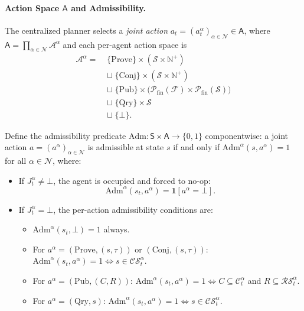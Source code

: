  
\paragraph{Action Space $\mathsf{A}$ and Admissibility.}
 
The centralized planner selects a \emph{joint action} $a_t = (a^\alpha_t)_{\alpha\in\mathcal{N}} \in \mathsf{A}$, where $\mathsf{A}= \prod_{\alpha\in\mathcal{N}}\mathcal{A}^\alpha$ and each per-agent action space is
\begin{align*}
\mathcal{A}^\alpha
=\;&
\{\mathrm{Prove}\}\times(\mathcal{S}\times\mathbb{N}^+)
\\&\sqcup\;
\{\mathrm{Conj}\}\times(\mathcal{S}\times\mathbb{N}^+)
\\&\sqcup\;
\{\mathrm{Pub}\}\times\big(\mathcal{P}_{\mathrm{fin}}(\mathcal{F})\times \mathcal{P}_{\mathrm{fin}}(\mathcal{S})\big)
\\&\sqcup\;
\{\mathrm{Qry}\}\times \mathcal{S}
\\&\sqcup\;\{\bot\}.
\end{align*}
 
Define the admissibility predicate $\mathrm{Adm}:\mathsf{S}\times\mathsf{A}\to\{0,1\}$ componentwise: a joint action $a=(a^\alpha)_{\alpha\in\mathcal{N}}$ is admissible at state $s$ if and only if $\mathrm{Adm}^\alpha(s,a^\alpha)=1$ for all $\alpha\in\mathcal{N}$, where:
\begin{itemize}
    \item If $J^\alpha_t\neq\bot$, the agent is occupied and forced to no-op:
    \[
    \mathrm{Adm}^\alpha(s_t,a^\alpha)=\mathbf{1}[a^\alpha=\bot].
    \]
    \item If $J^\alpha_t=\bot$, the per-action admissibility conditions are:
    \begin{itemize}
    \item $\mathrm{Adm}^\alpha(s_t,\bot)=1$ always.
    \item For $a^\alpha = (\mathrm{Prove},(s,\tau))$ or $(\mathrm{Conj},(s,\tau))$:
    $\mathrm{Adm}^\alpha(s_t,a^\alpha)=1 \iff s \in \mathcal{CS}_t^\alpha.$
    \item For $a^\alpha = (\mathrm{Pub},(C,R))$: $\mathrm{Adm}^\alpha(s_t,a^\alpha)=1 \iff C\subseteq\mathcal{C}_t^\alpha$ and $R\subseteq\mathcal{RS}_t^\alpha.$
    \item For $a^\alpha = (\mathrm{Qry},s)$: $\mathrm{Adm}^\alpha(s_t,a^\alpha)=1 \iff s \in \mathcal{CS}_t^\alpha.$
    \end{itemize}
\end{itemize}
 
